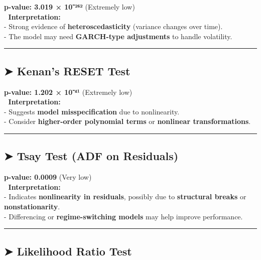 \documentclass[11pt]{article}
\begin{document}
\textbf{p-value: 3.019 × 10⁻²⁶²} (Extremely low)\\
📌 \textbf{Interpretation:}\\
- Strong evidence of \textbf{heteroscedasticity} (variance changes over
time).\\
- The model may need \textbf{GARCH-type adjustments} to handle
volatility.

\begin{center}\rule{0.5\linewidth}{0.5pt}\end{center}

\hypertarget{kenans-reset-test}{%
\subsection{\texorpdfstring{\textbf{➤ Kenan's RESET
Test}}{➤ Kenan's RESET Test}}\label{kenans-reset-test}}

\textbf{p-value: 1.202 × 10⁻⁴¹} (Extremely low)\\
📌 \textbf{Interpretation:}\\
- Suggests \textbf{model misspecification} due to nonlinearity.\\
- Consider \textbf{higher-order polynomial terms} or \textbf{nonlinear
transformations}.

\begin{center}\rule{0.5\linewidth}{0.5pt}\end{center}

\hypertarget{tsay-test-adf-on-residuals}{%
\subsection{\texorpdfstring{\textbf{➤ Tsay Test (ADF on
Residuals)}}{➤ Tsay Test (ADF on Residuals)}}\label{tsay-test-adf-on-residuals}}

\textbf{p-value: 0.0009} (Very low)\\
📌 \textbf{Interpretation:}\\
- Indicates \textbf{nonlinearity in residuals}, possibly due to
\textbf{structural breaks} or \textbf{nonstationarity}.\\
- Differencing or \textbf{regime-switching models} may help improve
performance.

\begin{center}\rule{0.5\linewidth}{0.5pt}\end{center}

\hypertarget{likelihood-ratio-test}{%
\subsection{\texorpdfstring{\textbf{➤ Likelihood Ratio
Test}}{➤ Likelihood Ratio Test}}\label{likelihood-ratio-test}}
\end{document}
